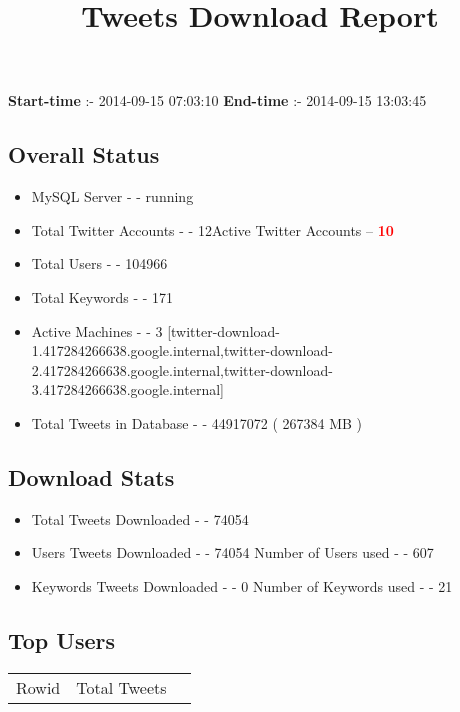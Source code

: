 \documentclass{article}\usepackage[T1]{fontenc}
\begin{document}
\title{\textbf{Tweets Download Report}}
               \date{}
                \maketitle
               \centerline{\textbf{Start-time} :- 2014-09-15 07:03:10 \hspace{40pt} \textbf{End-time} :- 2014-09-15 13:03:45}               \subsection*{Overall Status}                \begin{itemize}                \item MySQL Server - - running               \item Total Twitter Accounts - - 12\newline Active Twitter Accounts -- \textcolor{red}{\textbf{10}}               \item Total Users - - 104966               \item Total Keywords - - 171               \item Active Machines - - 3 [twitter-download-1.417284266638.google.internal,twitter-download-2.417284266638.google.internal,twitter-download-3.417284266638.google.internal]               \item Total Tweets in Database - - 44917072 ( 267384 MB )               \end{itemize}               \subsection*{Download Stats}                \begin{itemize}                \item Total Tweets Downloaded - - 74054               \item Users Tweets Downloaded - - 74054 \newline Number of Users used - - 607               \item Keywords Tweets Downloaded - - 0 \newline Number of Keywords used - - 21              \end{itemize}              \subsection*{Top Users}\begin{tabular}{|c|c|c|}         \hline         Rowid & Total Tweets \\ 

\end{tabular}
\end{document}
